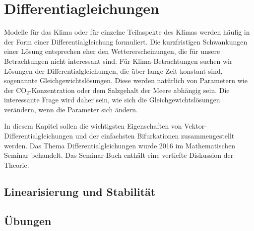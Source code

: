 %
%
%
\chapter{Differentiagleichungen\label{chapter:dgl}}
Modelle für das Klima oder für einzelne Teilaspekte des Klimas 
werden häufig in der Form einer Differentialgleichung formuliert.
Die kurzfristigen Schwankungen einer Lösung entsprechen 
eher den Wettererscheinungen, die für unsere Betrachtungen nicht
interessant sind.
Für Klima-Betrachtungen suchen wir Lösungen der Differentialgleichungen,
die über lange Zeit konstant sind, sogenannte Gleichgewichtslösungen.
Diese werden natürlich von Parametern wie der $\text{CO}_2$-Konzentration
oder dem Salzgehalt der Meere abhängig sein.
Die interessante Frage wird daher sein, wie sich die Gleichgewichtslösungen
verändern, wenn die Parameter sich ändern.

In diesem Kapitel sollen die wichtigsten Eigenschaften von
Vektor-Differentialgleichungen und der einfachsten Bifurkationen
zusammengestellt werden.
Das Thema Differentialgleichungen wurde 2016 im Mathematischen Seminar
behandelt.
Das Seminar-Buch \cite{skript:mathsem-dgl} enthält eine vertiefte Diskussion
der Theorie.




\section{Linearisierung und Stabilität}

\section*{Übungen}
\begin{uebungsaufgaben}
\item

\end{uebungsaufgaben}

